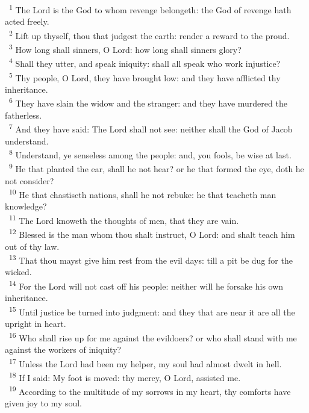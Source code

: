 \documentclass[a5paper,12pt]{article}
\begin{document}
\begin{multicols*}{2}
~\textsuperscript{1} The Lord is the God to whom revenge belongeth: the God of revenge hath acted freely.\\
~\textsuperscript{2} Lift up thyself, thou that judgest the earth: render a reward to the proud.\\
~\textsuperscript{3} How long shall sinners, O Lord: how long shall sinners glory?\\
~\textsuperscript{4} Shall they utter, and speak iniquity: shall all speak who work injustice?\\
~\textsuperscript{5} Thy people, O Lord, they have brought low: and they have afflicted thy inheritance.\\
~\textsuperscript{6} They have slain the widow and the stranger: and they have murdered the fatherless.\\
~\textsuperscript{7} And they have said: The Lord shall not see: neither shall the God of Jacob understand.\\
~\textsuperscript{8} Understand, ye senseless among the people: and, you fools, be wise at last.\\
~\textsuperscript{9} He that planted the ear, shall he not hear? or he that formed the eye, doth he not consider?\\
~\textsuperscript{10} He that chastiseth nations, shall he not rebuke: he that teacheth man knowledge?\\
~\textsuperscript{11} The Lord knoweth the thoughts of men, that they are vain.\\
~\textsuperscript{12} Blessed is the man whom thou shalt instruct, O Lord: and shalt teach him out of thy law.\\
~\textsuperscript{13} That thou mayst give him rest from the evil days: till a pit be dug for the wicked.\\
~\textsuperscript{14} For the Lord will not cast off his people: neither will he forsake his own inheritance.\\
~\textsuperscript{15} Until justice be turned into judgment: and they that are near it are all the upright in heart.\\
~\textsuperscript{16} Who shall rise up for me against the evildoers? or who shall stand with me against the workers of iniquity?\\
~\textsuperscript{17} Unless the Lord had been my helper, my soul had almost dwelt in hell.\\
~\textsuperscript{18} If I said: My foot is moved: thy mercy, O Lord, assisted me.\\
~\textsuperscript{19} According to the multitude of my sorrows in my heart, thy comforts have given joy to my soul.\\

\end{multicols*}
\end{document}
